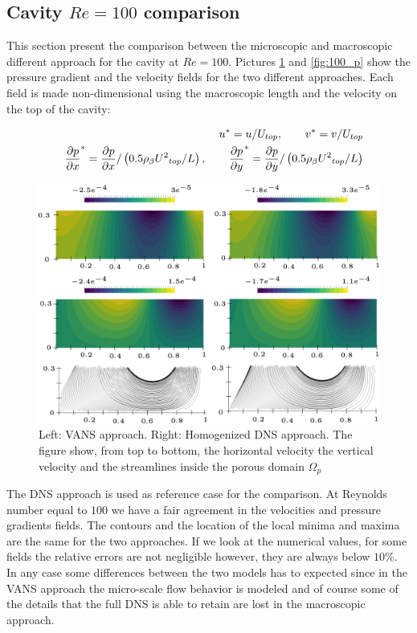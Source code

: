 \subsection{Cavity $Re=100$ comparison}

This section present the comparison between the microscopic and macroscopic different approach for the cavity at $Re=100$. Pictures \ref{fig:100_u} and \ref{fig:100_p} show the pressure gradient and the velocity fields for the two different approaches.
Each field is made non-dimensional using the macroscopic length and the velocity on the top of the cavity:

\begin{eqnarray}
&& u^* = u/U_{top}, \qquad v^* = v/U_{top} \nonumber \\
&& \dfrac{\partial p}{\partial x}^* = \dfrac{\partial p}{\partial x} / \left(0.5 \rho_{\beta} {U^2}_{top} /L  \right), \qquad \dfrac{\partial p}{\partial y}^* = \dfrac{\partial p}{\partial y} / \left(0.5 \rho_{\beta} {U^2}_{top} /L  \right) \nonumber
\end{eqnarray}


\begin{figure}[h]
	\centering
	\includegraphics[width=1\linewidth]{chapter_5/figure/re100/vans_u}
	\caption{Left: VANS approach. Right: Homogenized DNS approach. The figure show, from top to bottom, the horizontal velocity the vertical velocity and the streamlines inside the porous domain $\Omega_p$}
	\label{fig:100_u}
\end{figure}

The DNS approach is used as reference case for the comparison. At Reynolds number equal to $100$ we have a fair agreement in the velocities and pressure gradients fields. The contours and the location of the local minima and maxima are the same for the two approaches. If we look at the numerical values, for some fields the relative errors are not negligible however, they are always below $10\%$.
In any case some differences between the two models has to expected since in the VANS approach the micro-scale flow behavior is modeled and of course some of the details that the full DNS is able to retain are lost in the macroscopic approach. 

